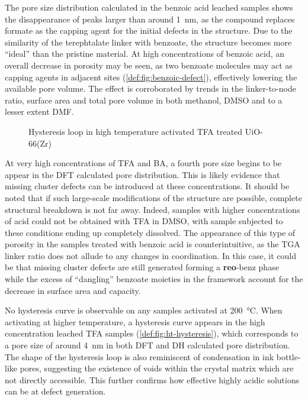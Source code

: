 The pore size distribution calculated in the benzoic acid leached
samples shows the disappearance of peaks larger than around 
\SI{1}{\nano\metre}, as the compound replaces formate as the 
capping agent for the initial defects in the structure. Due to the 
similarity of the terephtalate linker with benzoate, the structure
becomes more ``ideal'' than the pristine material. At high concentrations
of benzoic acid, an overall decrease in porosity may be seen, as 
two benzoate molecules may act as capping agents in adjacent 
sites (\autoref{def:fig:benzoic-defect}), effectively 
lowering the available pore volume. The effect is corroborated 
by trends in the linker-to-node ratio, surface area and total 
pore volume in both methanol, \gls{DMSO} and to a lesser extent \gls{DMF}.

\begin{wrapfigure}[13]{r}{0.3\textwidth}
    \centering
    \captionsetup{format=plain}
    \caption{Hysteresis loop in high temperature activated \gls{TFA} treated 
    UiO-66(Zr)}%
    \label{def:fig:ht-hysteresis}
\end{wrapfigure}

At very high concentrations of \gls{TFA} and \gls{BA}, a fourth pore size
begins to be appear in the \gls{DFT} calculated pore distribution.
This is likely evidence that missing cluster defects can be 
introduced at these concentrations. It should be noted that 
if such large-scale modifications of the structure are possible,
complete structural breakdown is not far away. Indeed, samples with 
higher concentrations of acid could not be obtained with \gls{TFA} in \gls{DMSO},
with sample subjected to these conditions ending up completely
dissolved. The appearance of this type of porosity in the samples
treated with benzoic acid is counterintuitive, as the \gls{TGA} linker
ratio does not allude to any changes in coordination. In this case,
it could be that missing cluster defects are still generated
forming a \textbf{reo}-benz phase~\cite{atzoriEffectBenzoicAcid2017} 
while the excess of ``dangling'' benzoate moieties in the framework 
account for the decrease in surface area and capacity.

No hysteresis curve is observable on any samples activated at 
\SI{200}{\degreeCelsius}. When activating at higher temperature,
a hysteresis curve appears in the high concentration leached
\gls{TFA} samples (\autoref{def:fig:ht-hysteresis}), which corresponds to
a pore size of around \SI{4}{\nano\metre} in both \gls{DFT} and \gls{DH} calculated
pore distribution. The shape of the hysteresis loop is also 
reminiscent of condensation in ink bottle-like pores, suggesting
the existence of voids within the crystal matrix which are 
not directly accessible. This further confirms how effective 
highly acidic solutions can be at defect generation.